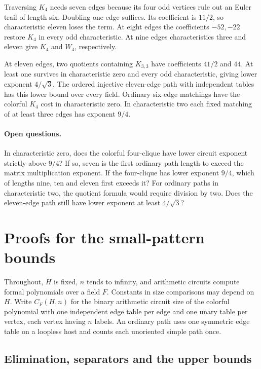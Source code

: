 \documentclass[11pt,letterpaper]{article}
\begin{document}
Traversing \(K_4\) needs seven edges because its four odd vertices rule out
an Euler trail of length six. Doubling one edge suffices. Its coefficient
is \(11/2\), so characteristic eleven loses the term. At eight edges the
coefficients \(-52,-22\) restore \(K_4\) in every odd characteristic.
At nine edges characteristics three and eleven give \(K_4\) and \(W_4\), respectively.

At eleven edges, two quotients containing \(K_{3,3}\) have coefficients
\(41/2\) and \(44\). At least one survives in characteristic zero and every odd
characteristic, giving lower exponent \(4/\sqrt3\). The ordered injective
eleven-edge path with independent tables has this lower bound over every field.
Ordinary six-edge matchings have the colorful \(K_4\) cost in characteristic
zero. In characteristic two each fixed matching of at least three edges has
exponent \(9/4\).

\paragraph{Open questions.}
In characteristic zero, does the colorful four-clique have lower circuit exponent
strictly above \(9/4\)? If so, seven is the first ordinary path length to exceed
the matrix multiplication exponent. If the four-clique has lower exponent
\(9/4\), which of lengths nine, ten and eleven first exceeds it?
For ordinary paths in characteristic two, the quotient formula would require
division by two. Does the eleven-edge path still have lower exponent at least \(4/\sqrt3\)?

\clearpage
\appendix
\section{Proofs for the small-pattern bounds}\label{proofs-for-the-small-pattern-bounds}

Throughout, \(H\) is fixed, \(n\) tends to infinity, and arithmetic circuits compute formal polynomials over a field \(F\). Constants in size comparisons may depend on \(H\). Write \(C_F(H,n)\) for the binary arithmetic circuit size of the colorful polynomial with one independent edge table per edge and one unary table per vertex, each vertex having \(n\) labels. An ordinary path uses one symmetric edge table on a loopless host and counts each unoriented simple path once.

\subsection{Elimination, separators and the upper bounds}\label{elimination-separators-and-the-upper-bounds}
\end{document}
